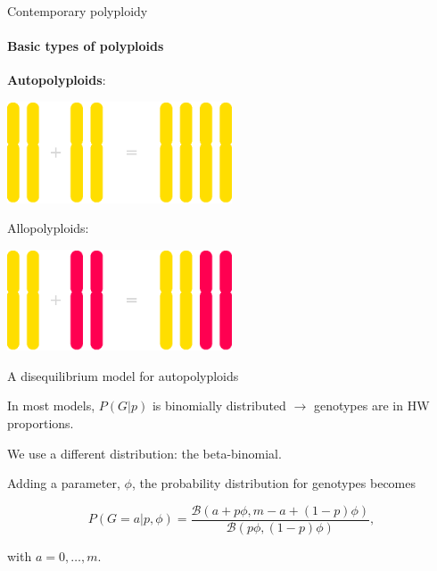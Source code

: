 \documentclass[presentation,sansserif,12pt]{beamer}
\begin{document}
\begin{frame}[t]{Contemporary polyploidy}
\framesubtitle{Basic types of polyploids}


	\begin{tcolorbox}[colframe=itemcol, colback=white!40!black, coltext=white!95!black]
	\textbf{Autopolyploids}:

	\begin{center}
		\includegraphics[width=0.5\textwidth]{eps/autopolyploid-formation}
	\end{center}
	
	\end{tcolorbox}
	
	Allopolyploids:
	
	\begin{center}
		{\includegraphics[width=0.5\textwidth]{eps/allopolyploid-formation}}
	\end{center}

\end{frame}

\begin{frame}[t]{A disequilibrium model for autopolyploids}

  In most models, $P(G|p)$ is binomially distributed $\rightarrow$ genotypes are in HW proportions.
  \vspace{0.3in}
  \pause
  
  We use a different distribution: the beta-binomial.
  \vspace{0.3in}
  \pause
  
  Adding a parameter, $\phi$, the probability distribution for genotypes becomes
  \vspace{0.1in}
  
  \begin{equation}
    P(G=a|p,\phi) = \frac{\mathcal{B}(a + p\phi, m - a + (1-p)\phi)}{\mathcal{B}(p\phi, (1-p)\phi)},
  \end{equation}

with $a = 0,\dots,m$.
  
  \end{frame}
  
\end{document}
